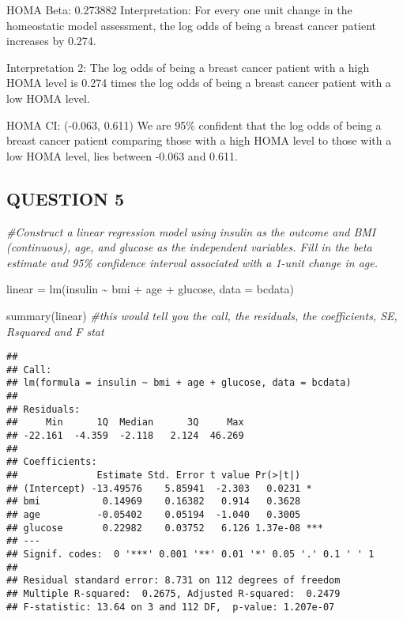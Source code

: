 \documentclass[
]{article}
\newenvironment{Shaded}{\begin{snugshade}}{\end{snugshade}}
\newcommand{\AttributeTok}[1]{\textcolor[rgb]{0.77,0.63,0.00}{#1}}
\newcommand{\CommentTok}[1]{\textcolor[rgb]{0.56,0.35,0.01}{\textit{#1}}}
\newcommand{\FunctionTok}[1]{\textcolor[rgb]{0.00,0.00,0.00}{#1}}
\newcommand{\NormalTok}[1]{#1}
\newcommand{\OtherTok}[1]{\textcolor[rgb]{0.56,0.35,0.01}{#1}}
\newcommand{\SpecialCharTok}[1]{\textcolor[rgb]{0.00,0.00,0.00}{#1}}
\begin{document}
HOMA Beta: 0.273882 Interpretation: For every one unit change in the
homeostatic model assessment, the log odds of being a breast cancer
patient increases by 0.274.

Interpretation 2: The log odds of being a breast cancer patient with a
high HOMA level is 0.274 times the log odds of being a breast cancer
patient with a low HOMA level.

HOMA CI: (-0.063, 0.611) We are 95\% confident that the log odds of
being a breast cancer patient comparing those with a high HOMA level to
those with a low HOMA level, lies between -0.063 and 0.611.

\hypertarget{question-5}{%
\subsection{QUESTION 5}\label{question-5}}

\begin{Shaded}
\begin{Highlighting}[]
\CommentTok{\#Construct a linear regression model using insulin as the outcome and BMI (continuous), age, and glucose as the independent variables. Fill in the beta estimate and 95\% confidence interval associated with a 1{-}unit change in age.}

\NormalTok{linear }\OtherTok{=} \FunctionTok{lm}\NormalTok{(insulin }\SpecialCharTok{\textasciitilde{}}\NormalTok{ bmi }\SpecialCharTok{+}\NormalTok{ age }\SpecialCharTok{+}\NormalTok{ glucose, }\AttributeTok{data =}\NormalTok{ bcdata)}

\FunctionTok{summary}\NormalTok{(linear) }\CommentTok{\#this would tell you the call, the residuals, the coefficients, SE, Rsquared and F stat}
\end{Highlighting}
\end{Shaded}

\begin{verbatim}
## 
## Call:
## lm(formula = insulin ~ bmi + age + glucose, data = bcdata)
## 
## Residuals:
##     Min      1Q  Median      3Q     Max 
## -22.161  -4.359  -2.118   2.124  46.269 
## 
## Coefficients:
##              Estimate Std. Error t value Pr(>|t|)    
## (Intercept) -13.49576    5.85941  -2.303   0.0231 *  
## bmi           0.14969    0.16382   0.914   0.3628    
## age          -0.05402    0.05194  -1.040   0.3005    
## glucose       0.22982    0.03752   6.126 1.37e-08 ***
## ---
## Signif. codes:  0 '***' 0.001 '**' 0.01 '*' 0.05 '.' 0.1 ' ' 1
## 
## Residual standard error: 8.731 on 112 degrees of freedom
## Multiple R-squared:  0.2675, Adjusted R-squared:  0.2479 
## F-statistic: 13.64 on 3 and 112 DF,  p-value: 1.207e-07
\end{verbatim}
\end{document}
